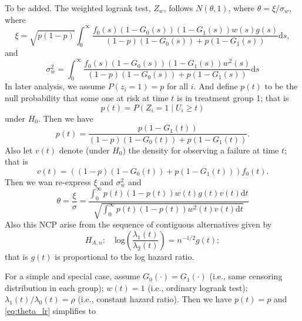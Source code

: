 \documentclass[a4paper,12pt]{article}
\begin{document}
{\color{red}To be added.}
The weighted logrank test, $Z_w$, follows $N\left(\theta, 1\right)$, where $\theta = \xi / \sigma_w$, where
\begin{equation}
  \label{eq:xi}
  \xi = \sqrt{p\left(1 - p\right)}
  \int_0^{\infty}
    \frac{
    f_0\left(s\right)\left(1 - G_0\left(s\right)\right)
    \left(1 - G_1\left(s\right)\right)
    w\left(s\right)g\left(s\right)
  }{
    \left(1 - p\right)
    \left(1 - G_0\left(s\right)\right)
    + p\left(1 - G_1\left(s\right)\right)
  }
  \mathrm{d}s
  ,
\end{equation}
and
\begin{equation}
  \label{eq:sigma}
  \sigma_w^2 =
  \int_0^\infty
  \frac{
    f_0\left(s\right)\left(1 - G_0\left(s\right)\right)\left(1 - G_1\left(s\right)\right)w^2\left(s\right)
  }{
    \left(1 - p\right)
    \left(1 - G_0\left(s\right)\right)
    + p\left(1 - G_1\left(s\right)\right)
  }
  \mathrm{d}s
\end{equation}
In later analysis, we assume  $P\left(z_i = 1\right) = p$ for all $i$. And define $p\left(t\right)$ to be the null probability that some one at risk at time $t$ is in treatment group 1; that is 
\[
  p\left(t\right) = P\left(Z_i = 1\middle|U_i\geq t\right)
\]
under $H_0$. Then we have
\[
  p\left(t\right) = \frac{
    p\left(1 - G_1\left(t\right)\right)
  }{
    \left(1 - p\right)\left(1 - G_0\left(t\right)\right)
    + p\left(1 - G_1\left(t\right)\right)
  }
  .
\]
Also let $v\left(t\right)$ denote (under $H_0$) the density for observing a failure at  time $t$; that is
\[
  v\left(t\right)
  = \left(
    \left(1 - p\right)\left(1 - G_0\left(t\right)\right)
    + p\left(1 - G_1\left(t\right)\right)
  \right)f_0\left(t\right)
  .
\]
Then we wan re-express $\xi$ and $\sigma_w^2$ and
\begin{equation}
  \label{eq:theta_lr}
  \theta = \frac{\xi}{\sigma}
  = \frac{
    \int_0^\infty
    p\left(t\right)\left(1 - p\left(t\right)\right)
    w\left(t\right)
    g\left(t\right)
    v\left(t\right)
    \mathrm{d}t
  }{
    \sqrt{\int_0^\infty
      p\left(t\right)\left(1 - p\left(t\right)\right)
      w^2\left(t\right)v\left(t\right)
      \mathrm{d}t
    }
  }
\end{equation}
Also this NCP arise from the sequence of contiguous alternatives given by
\[
  H_{A, n}: \quad
  \mathrm{log}\left(
    \frac{\lambda_1\left(t\right)}{\lambda_2\left(t\right)}
  \right)
  = n^{-1 / 2}g\left(t\right)
  ;
\]
that is $g\left(t\right)$ is proportional to the log hazard ratio.
\par
For a simple and special case, assume $G_0\left(\cdot\right) = G_1\left(\cdot\right)$ (i.e., same censoring distribution in each group); $w\left(t\right) = 1$ (i.e., ordinary logrank test); $\lambda_1\left(t\right) / \lambda_0\left(t\right) = \rho$ (i.e., constant hazard ratio). Then we have $p\left(t\right) = p$ and \eqref{eq:theta_lr} simplifies to
\end{document}
